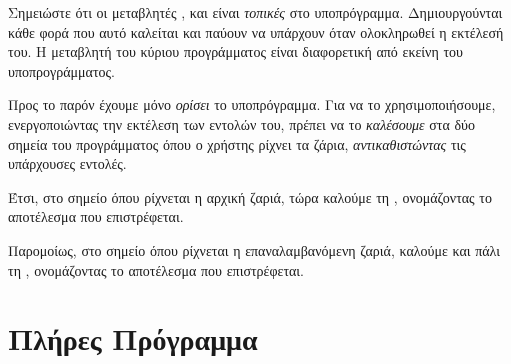 \documentclass[a4paper,11pt,oneside]{book}
\begin{document}
Σημειώστε ότι οι μεταβλητές ,  και  είναι \emph{τοπικές} στο υποπρόγραμμα. Δημιουργούνται κάθε φορά που αυτό καλείται και παύουν να υπάρχουν όταν ολοκληρωθεί η εκτέλεσή του. Η μεταβλητή  του κύριου προγράμματος είναι διαφορετική από εκείνη του υποπρογράμματος.

%

Προς το παρόν έχουμε μόνο \emph{ορίσει} το υποπρόγραμμα. Για να το χρησιμοποιήσουμε, ενεργοποιώντας την εκτέλεση των εντολών του, πρέπει να το \emph{καλέσουμε} στα δύο σημεία του προγράμματος όπου ο χρήστης ρίχνει τα ζάρια, \emph{αντικαθιστώντας} τις υπάρχουσες εντολές.

Έτσι, στο σημείο όπου ρίχνεται η αρχική ζαριά, τώρα καλούμε τη , ονομάζοντας  το αποτέλεσμα που επιστρέφεται.


Παρομοίως, στο σημείο όπου ρίχνεται η επαναλαμβανόμενη ζαριά, καλούμε και πάλι τη , ονομάζοντας  το αποτέλεσμα που επιστρέφεται.




\section{Πλήρες Πρόγραμμα}
\end{document}
